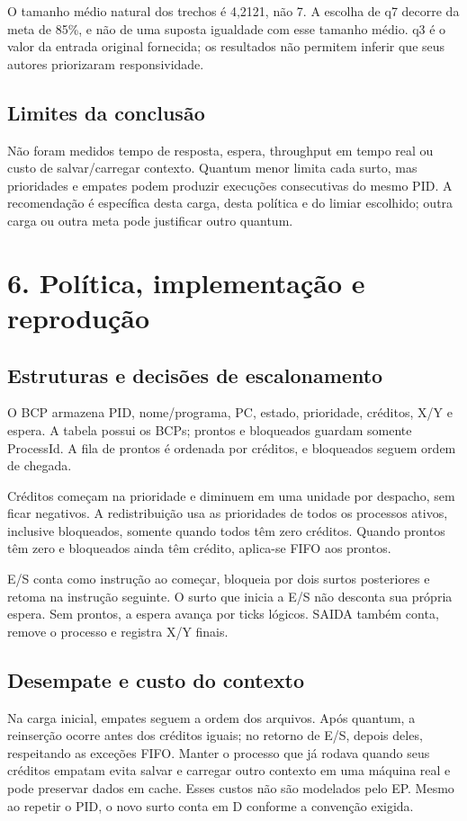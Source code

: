 \documentclass[10pt,a4paper]{article}
\begin{document}
O tamanho médio natural dos trechos é 4,2121, não 7. A escolha de q7 decorre da meta de 85\%, e não de uma suposta igualdade com esse tamanho médio. q3 é o valor da entrada original fornecida; os resultados não permitem inferir que seus autores priorizaram responsividade.

\subsection*{Limites da conclusão}
Não foram medidos tempo de resposta, espera, throughput em tempo real ou custo de salvar/carregar contexto. Quantum menor limita cada surto, mas prioridades e empates podem produzir execuções consecutivas do mesmo PID. A recomendação é específica desta carga, desta política e do limiar escolhido; outra carga ou outra meta pode justificar outro quantum.

\clearpage
\section*{6. Política, implementação e reprodução}
\subsection*{Estruturas e decisões de escalonamento}
O BCP armazena PID, nome/programa, PC, estado, prioridade, créditos, X/Y e espera. A tabela possui os BCPs; prontos e bloqueados guardam somente ProcessId. A fila de prontos é ordenada por créditos, e bloqueados seguem ordem de chegada.

Créditos começam na prioridade e diminuem em uma unidade por despacho, sem ficar negativos. A redistribuição usa as prioridades de todos os processos ativos, inclusive bloqueados, somente quando todos têm zero créditos. Quando prontos têm zero e bloqueados ainda têm crédito, aplica-se FIFO aos prontos.

E/S conta como instrução ao começar, bloqueia por dois surtos posteriores e retoma na instrução seguinte. O surto que inicia a E/S não desconta sua própria espera. Sem prontos, a espera avança por ticks lógicos. SAIDA também conta, remove o processo e registra X/Y finais.

\subsection*{Desempate e custo do contexto}
Na carga inicial, empates seguem a ordem dos arquivos. Após quantum, a reinserção ocorre antes dos créditos iguais; no retorno de E/S, depois deles, respeitando as exceções FIFO. Manter o processo que já rodava quando seus créditos empatam evita salvar e carregar outro contexto em uma máquina real e pode preservar dados em cache. Esses custos não são modelados pelo EP. Mesmo ao repetir o PID, o novo surto conta em D conforme a convenção exigida.
\end{document}
